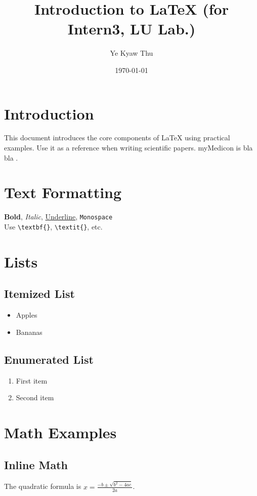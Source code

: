 \documentclass[12pt,a4paper]{article}
\title{Introduction to \LaTeX{} (for Intern3, LU Lab.)}
\author{Ye Kyaw Thu}
\date{\today}
\begin{document}
\maketitle
\tableofcontents
\newpage

\section{Introduction}
This document introduces the core components of \LaTeX{} using practical examples. Use it as a reference when writing scientific papers.
myMedicon is bla bla \cite{htun-etal-2024-mymedicon}.

\section{Text Formatting}
\textbf{Bold}, \textit{Italic}, \underline{Underline}, \texttt{Monospace} \\
Use \verb|\textbf{}|, \verb|\textit{}|, etc.

\section{Lists}
\subsection{Itemized List}
\begin{itemize}
  \item Apples
  \item Bananas
\end{itemize}

\subsection{Enumerated List}
\begin{enumerate}
  \item First item
  \item Second item
\end{enumerate}

\section{Math Examples}
\subsection{Inline Math}
The quadratic formula is $x = \frac{-b \pm \sqrt{b^2 - 4ac}}{2a}$.
\end{document}
